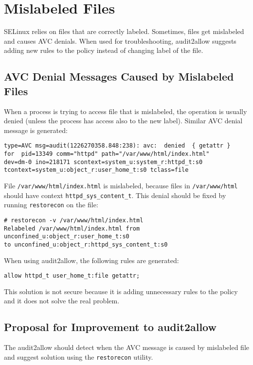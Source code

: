 \section{Mislabeled Files}
SELinux relies on files that are correctly labeled. Sometimes, files get
mislabeled and causes AVC denials. When used for troubleshooting, audit2allow
suggests adding new rules to the policy instead of changing label of the file.


\subsection{AVC Denial Messages Caused by Mislabeled Files}
When a process is trying to access file that is mislabeled, the operation is
usually denied (unless the process has access also to the new label). Similar
AVC denial message is generated:
\begin{lstlisting}
type=AVC msg=audit(1226270358.848:238): avc:  denied  { getattr }
for  pid=13349 comm="httpd" path="/var/www/html/index.html"
dev=dm-0 ino=218171 scontext=system_u:system_r:httpd_t:s0
tcontext=system_u:object_r:user_home_t:s0 tclass=file
\end{lstlisting}
File \texttt{/var/www/html/index.html} is mislabeled, because files in
\texttt{/var/www/html} should have context \texttt{httpd\_sys\_content\_t}. This
denial should be fixed by running \texttt{restorecon} on the file:
\begin{lstlisting}
# restorecon -v /var/www/html/index.html
Relabeled /var/www/html/index.html from unconfined_u:object_r:user_home_t:s0
to unconfined_u:object_r:httpd_sys_content_t:s0
\end{lstlisting}

When using audit2allow, the following rules are generated:
\begin{lstlisting}
allow httpd_t user_home_t:file getattr;
\end{lstlisting}
This solution is not secure because it is adding unnecessary rules to the policy
and it does not solve the real problem.

\subsection{Proposal for Improvement to audit2allow}
The audit2allow should detect when the AVC message is caused by mislabeled file
and suggest solution using the \texttt{restorecon} utility.

